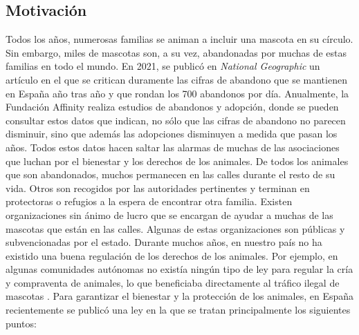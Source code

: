 \documentclass[a4paper, 12pt]{article}
\begin{document}
\subsection{Motivación}

Todos los años, numerosas familias se animan a incluir una mascota en su círculo. Sin embargo, miles de mascotas son, a su vez, abandonadas por muchas de estas familias en todo el mundo. En 2021, se publicó en \textit{National Geographic} un artículo \cite{nationalgeographic} en el que se critican duramente las cifras de abandono que se mantienen en España año tras año y que rondan los 700 abandonos por día. Anualmente, la Fundación Affinity realiza estudios de abandonos y adopción, donde se pueden consultar estos datos \cite{affinity} que indican, no sólo que las cifras de abandono no parecen disminuir, sino que además las adopciones disminuyen a medida que pasan los años. Todos estos datos hacen saltar las alarmas de muchas de las asociaciones que luchan por el bienestar y los derechos de los animales. De todos los animales que son abandonados, muchos permanecen en las calles durante el resto de su vida. Otros son recogidos por las autoridades pertinentes y terminan en protectoras o refugios a la espera de encontrar otra familia. Existen organizaciones sin ánimo de lucro que se encargan de ayudar a muchas de las mascotas que están en las calles. Algunas de estas organizaciones son públicas y subvencionadas por el estado. Durante muchos años, en nuestro país no ha existido una buena regulación de los derechos de los animales. Por ejemplo, en algunas comunidades autónomas no existía ningún tipo de ley para regular la cría y compraventa de animales, lo que beneficiaba directamente al tráfico ilegal de mascotas \cite{trafico}. Para garantizar el bienestar y la protección de los animales, en España recientemente se publicó una ley \cite{ley} en la que se tratan principalmente los siguientes puntos:
\end{document}
